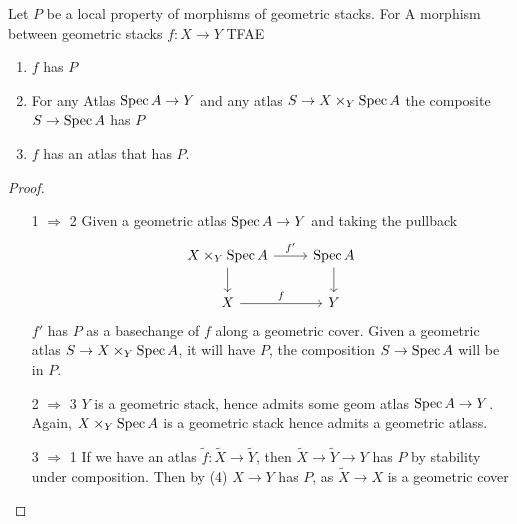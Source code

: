 \documentclass{article}
\begin{document}
\begin{lemma}{\label{lemma:atlasOfMap}}
    Let $P$ be a local property of morphisms of geometric stacks. For
    A morphism between geometric stacks $f : X \to Y$  TFAE 
    \begin{enumerate}
    	\item $f$ has $P$

    	\item For any Atlas $\operatorname{Spec} A \to Y$ and any atlas $S \to X \times_Y \operatorname{Spec} A$ the composite $S \to \operatorname{Spec} A$ has $P$
	    \item $f$ has an atlas that has $P$.
    \end{enumerate}
\end{lemma}
\begin{proof}
\begin{itemize}
	\item [1 $\Rightarrow$ 2]
	Given a geometric atlas $\operatorname{Spec} A \to Y$ and taking the pullback %
	\[\begin{tikzcd}
		{X \times_Y \Spec A} & {\Spec A} \\
		X & Y
		\arrow["{f'}", from=1-1, to=1-2]
		\arrow[from=1-1, to=2-1]
		\arrow[from=1-2, to=2-2]
		\arrow["f", from=2-1, to=2-2]
	\end{tikzcd}\]
$f'$ has $P$ as a basechange of $f$ along a geometric cover. Given a geometric atlas $S \to X \times_Y \operatorname{Spec} A$, it will have $P$, the composition $S \to \operatorname{Spec} A$ will be in $P$.
\item [2 $\Rightarrow$ 3]
$Y$ is a geometric stack, hence admits some geom atlas $\operatorname{Spec} A \to Y$. Again, $X \times_Y \operatorname{Spec} A$ is a geometric stack hence admits a geometric atlass.
\item [3 $\Rightarrow$ 1]
	If we have an atlas $\tilde f : \tilde X \to \tilde Y$, then $\tilde X \to \tilde Y \to Y$ has $P$ by stability under composition. Then by (4) $X \to Y$ has $P$, as $\tilde X \to X$ is a geometric cover \\

\end{itemize}
\end{proof}
\end{document}
